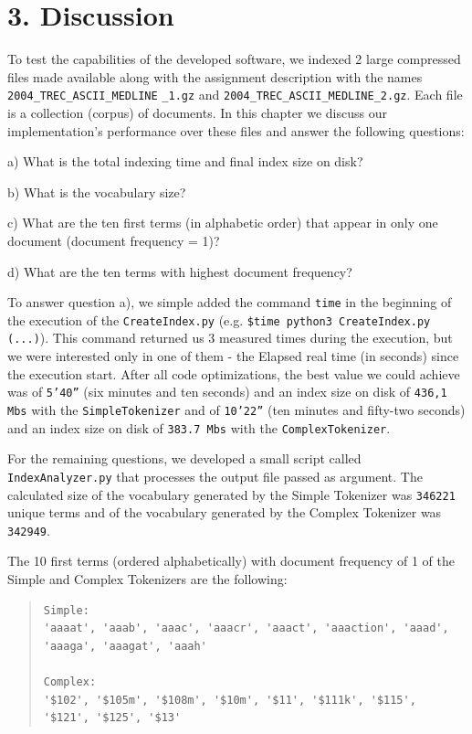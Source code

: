 \documentclass[12pt]{article}
\begin{document}
\newpage
\section*{3. Discussion}

To test the capabilities of the developed software, we indexed 2 large 
compressed files made available along with the assignment description
with the names \texttt{2004\_TREC\_ASCII\_MEDLINE} \texttt{\_1.gz} and 
\texttt{2004\_TREC\_ASCII\_MEDLINE\_2.gz}.
Each file is a collection (corpus) of documents.
In this chapter we discuss our implementation's performance over these 
files and answer the following questions:

a) What is the total indexing time and final index size on disk?

b) What is the vocabulary size?

c) What are the ten first terms (in alphabetic order) that appear in 
only one document (document frequency = 1)?

d) What are the ten terms with highest document frequency?

To answer question a), we simple added the command \texttt{time} in the
beginning of the execution of the \texttt{CreateIndex.py} 
(e.g. \texttt{\$time python3 CreateIndex.py (...)}).
This command returned us 3 measured times during the execution, but we 
were interested only in one of them - the Elapsed real time (in seconds)
since the execution start.
After all code optimizations, the best value we could achieve was of 
\texttt{5'40''} (six minutes and ten seconds) and an index size on 
disk of \texttt{436,1 Mbs} with the \texttt{SimpleTokenizer} and of 
\texttt{10'22''} (ten minutes and fifty-two seconds) and an index 
size on disk of \texttt{383.7 Mbs} with the \texttt{ComplexTokenizer}.

For the remaining questions, we developed a small script called
\texttt{IndexAnalyzer.py} that processes the output file passed as argument.
The calculated size of the vocabulary generated by the Simple Tokenizer
was \texttt{346221} unique terms and of the vocabulary generated by the 
Complex Tokenizer was \texttt{342949}.

The 10 first terms (ordered alphabetically) with document frequency of 1 
of the Simple and Complex Tokenizers are the following:

\begingroup
\addtolength\leftmargini{-0.4in}
\addtolength\baselineskip{-0.05in}
\begin{quote}
\begin{verbatim}
Simple:
'aaaat', 'aaab', 'aaac', 'aaacr', 'aaact', 'aaaction', 'aaad', 
'aaaga', 'aaagat', 'aaah'

Complex:
'$102', '$105m', '$108m', '$10m', '$11', '$111k', '$115',
'$121', '$125', '$13'
\end{verbatim}
\end{quote}
\endgroup
\end{document}
